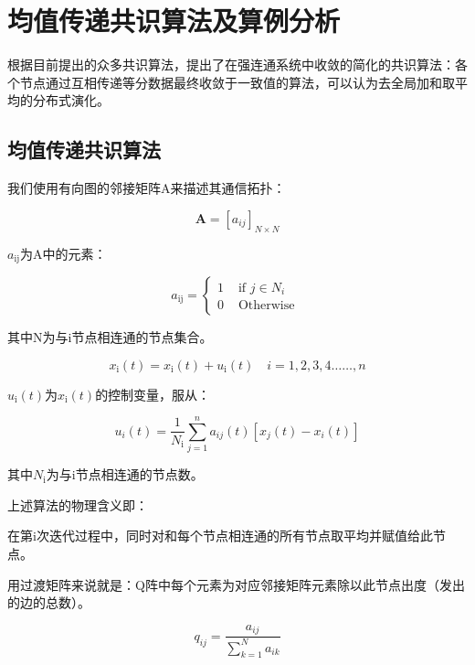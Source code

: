 \chapter{均值传递共识算法及算例分析}
\label{cha:Simple}

根据目前提出的众多共识算法，提出了在强连通系统中收敛的简化的共识算法：各个节点通过互相传递等分数据最终收敛于一致值的算法，可以认为去全局加和取平均的分布式演化。

\section{均值传递共识算法}

我们使用有向图的邻接矩阵A来描述其通信拓扑：

\begin{equation}
    \mathbf{A}=\left[a_{i j}\right]_{N \times N}
\end{equation}

$a_{\mathrm{ij}}$为A中的元素：

\begin{equation}
    a_{\mathrm{ij}}=\left\{\begin{array}{ll}
    {1} & {\text { if } j \in N_{i}} \\
    {0} & {\text { Otherwise }}
    \end{array}\right.
\end{equation}

其中N为与i节点相连通的节点集合。

\begin{equation}
    x_{\mathrm{i}}(t)=x_{\mathrm{i}}(t)+u_{\mathrm{i}}(t) \quad i=1,2,3,4 \ldots \ldots, n
\end{equation}

$u_{\mathrm{i}}(t)$为$x_{\mathrm{i}}(t)$的控制变量，服从：

\begin{equation}
    u_{i}(t)=\frac{1}{N_{\mathrm{i}}}\sum_{j=1}^{n} a_{i j}(t)\left[x_{j}(t)-x_{i}(t)\right]
\end{equation}

其中$N_{\mathrm{i}}$为与i节点相连通的节点数。

上述算法的物理含义即：

在第i次迭代过程中，同时对和每个节点相连通的所有节点取平均并赋值给此节点\cite{8706900}。

用过渡矩阵来说就是：Q阵中每个元素为对应邻接矩阵元素除以此节点出度（发出的边的总数）。

\begin{equation}
    q_{i j}=\frac{a_{i j}}{\sum_{k=1}^{N} a_{i k}}
\end{equation}

